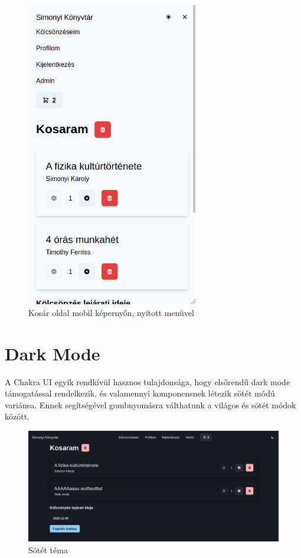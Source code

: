 \begin{figure}[!ht]
  \centering
  \includegraphics[width=75mm, keepaspectratio]{figures/cart-mobile.png}
  \caption{Kosár oldal mobil képernyőn, nyitott menüvel}
  \label{fig:CartMobile}
\end{figure}

\section{Dark Mode}

A Chakra UI egyik rendkívül hasznos tulajdonsága, hogy elsőrendű dark mode támogatással rendelkezik, és valamennyi komponensnek
létezik sötét módú variánsa.
Ennek segítségével gombnyomásra válthatunk a világos és sötét módok között.

\begin{figure}[!ht]
  \centering
  \includegraphics[width=150mm, keepaspectratio]{figures/dark-mode.png}
  \caption{Sötét téma}
  \label{fig:DarkMode}
\end{figure}

